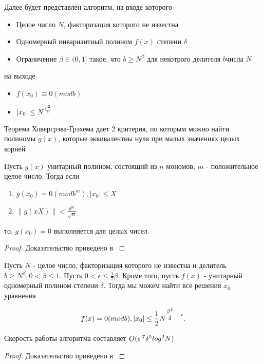   Далее будет представлен алгоритм, на входе которого  
    \begin{itemize}
     \item Целое число {$N$}, факторизация которого не известна
     \item Одномерный инвариантный полином {$f(x)$} степени {$\delta$}
     \item Ограничение {$\beta \in (0,1]$} такое, что {$b \ge N^\beta$} для некотрого делителя {$b$}числа {$N$}
    \end{itemize}
  на выходе
    \begin{itemize}
     \item {$f(x_0) \equiv 0 (mod b)$}
     \item {$|x_0| \le N\textsuperscript{{$\frac{\beta^2}{\delta}$}}$}
    \end{itemize}
    
  Теорема Ховергрэва-Грэхема дает 2 критерия, по которым можно найти полиномы {$g(x)$}, которые эквивалентны нуля при малых значениях целых корней

  \begin{theorem}
   Пусть {$g(x)$} унитарный полином, состоящий из {$n$} мономов, {$m$} - положительное целое число. Тогда если
   
    \begin{enumerate}
     \item {$g(x_0) = 0(mod b^m), |x_0| \le X$}
     \item {$ \lVert g(x X) \lVert < \frac{b^m}{\sqrt{n}} $}
    \end{enumerate}
    
    то, {$g(x_0) = 0$} выполняется для целых чисел.
    
    \begin{proof}
      Доказательство приведено в \cite[Глава 8.2, страницы 321-322]{may10}
    \end{proof}

  \end{theorem}

  \begin{theorem}[Копперсмита]
    Пусть {$N$} - целое число, факторизация которого не известна и делитель {$b \ge N^\beta, 0 < \beta \le 1$}. Пусть {$0 < \epsilon \le \frac{1}{7}\beta$}.
    Кроме того, пусть {$f(x)$} - унитарный одномерный полином степени {$\delta$}. Тогда мы можем найти все решения {$x_0$} уравнения
    
      \begin{equation}
       \textit{{$ f(x) = 0 (mod b), |x_0| \le \frac{1}{2} N\textsuperscript{{$\frac{\beta^2}{\delta} - \epsilon$}} $}}.
      \end{equation}

    Скорость работы алгоритма составляет {$O(\epsilon\textsuperscript{-7} \delta^5 log^2 N)$}
    
    \begin{proof}
      Доказательство приведено в \cite[Глава 8.2, страницы 323-326]{may10}
    \end{proof}

  \end{theorem}

